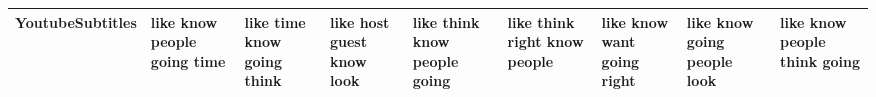 \documentclass[11pt,a4paper]{article}
\begin{document}
\begin{appendices}
\begin{table*}[htb]
\begin{tiny}
\begin{tabular}{|p{}|p{}|p{}|p{}|p{}|p{}|p{}|p{}|p{}|}
    YoutubeSubtitles & like \newline know \newline people \newline going \newline time & like \newline time \newline know \newline going \newline think & like \newline host \newline guest \newline know \newline look & like \newline think \newline know \newline people \newline going & like \newline think \newline right \newline know \newline people & like \newline know \newline want \newline going \newline right & like \newline know \newline going \newline people \newline look & like \newline know \newline people \newline think \newline going\\\hline

\end{tabular}
\end{tiny}
\end{table*}
\end{appendices}
\end{document}
